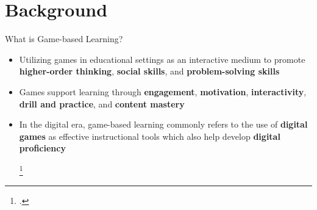 \documentclass{beamer}
\begin{document}
	
	\section{Background}
	\begin{frame}{What is Game-based Learning?}
		\label{link1}
		
		\begin{itemize}
			\item Utilizing games in educational settings as an interactive medium to promote {\color{blue}\textbf{higher-order thinking}}, {\color{blue}\textbf{social skills}}, and {\color{blue}\textbf{problem-solving skills}} \newline
			\item Games support learning through {\color{blue}\textbf{engagement}}, {\color{blue}\textbf{motivation}}, {\color{blue}\textbf{interactivity}}, 
			{\color{blue}\textbf{drill and practice}}, and {\color{blue}\textbf{content mastery}} \newline
			\item In the digital era, game-based learning commonly refers to the use of {\color{blue}\textbf{digital games}} as effective instructional tools which also help develop {\color{blue}\textbf{digital proficiency}} 
			
			
		\tiny\footcite{brown1989situated, jan2016game}
		\end{itemize}
		
	\end{frame}

		
		
\end{document}
